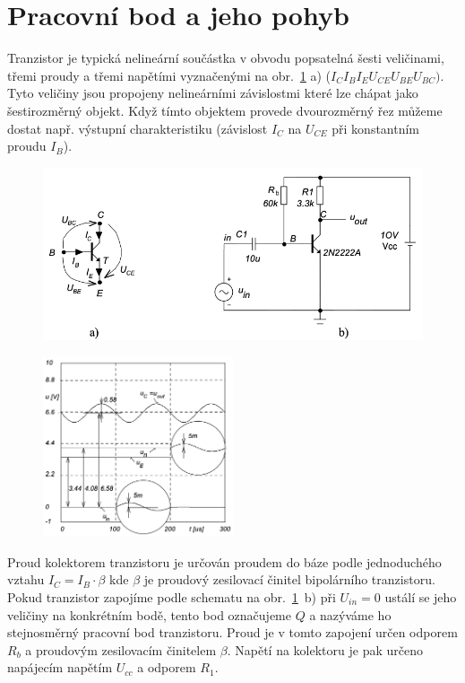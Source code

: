 \documentclass{article}
\newcommand \obr[1]
{ obr.~\ref{#1}}
\begin{document}
\section{Pracovní bod a jeho pohyb}

Tranzistor je typická nelineární součástka v obvodu popsatelná šesti veličinami, třemi proudy a třemi napětími vyznačenými na \obr{pracovni_bod_tranzistoru} a) (\(I_C I_B I_E U_{CE} U_{BE} U_{BC})\).
Tyto veličiny jsou propojeny nelineárními závislostmi které lze chápat jako šestirozměrný objekt.
Když tímto objektem provede dvourozměrný řez můžeme dostat např. výstupní charakteristiku (závislost \(I_C\) na \(U_{CE}\)
při konstantním proudu \(I_B\)).
\vspace{-1mm}
\begin{figure}[H]
    \includegraphics[width=\textwidth]{pracovni_bod_tranzistoru.png}
    \caption{\label{pracovni_bod_tranzistoru}}
\end{figure}


\vspace{1mm}
\begin{figure}
  \vspace{-5mm}
  \includegraphics[width=0.5\textwidth]{vstup-baze-vystup.png}
  \caption{\label{vstup_baze_vystup}}
\end{figure}
Proud kolektorem tranzistoru je určován proudem do báze podle jednoduchého vztahu \(I_C = I_B\cdot\beta\) kde \(\beta \) je proudový zesilovací činitel bipolárního tranzistoru.
Pokud tranzistor zapojíme podle schematu na \obr{pracovni_bod_tranzistoru}~b) při \(U_{in} = 0\) ustálí se jeho veličiny na konkrétním bodě, tento bod označujeme \(Q\) a nazýváme ho stejnosměrný pracovní bod tranzistoru. 
Proud je v tomto zapojení určen odporem \(R_b\) a proudovým zesilovacím činitelem \(\beta\).
Napětí na kolektoru je pak určeno napájecím napětím \(U_{cc}\) a odporem \(R_1\).
\end{document}
